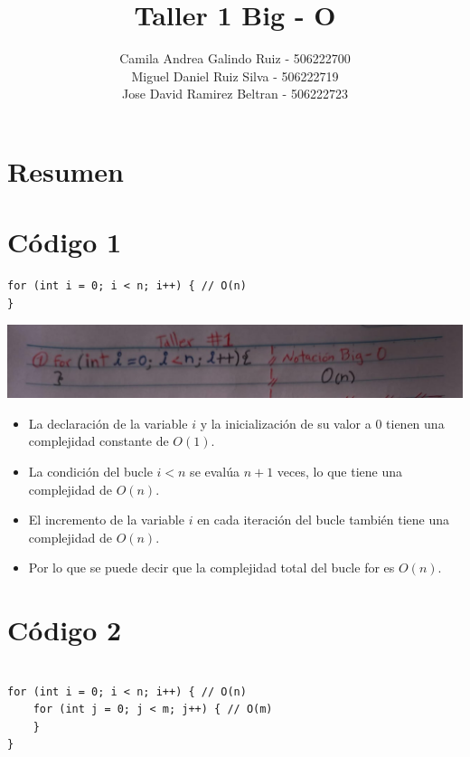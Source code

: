 \documentclass[a4paper,onecolumn,10pt]{article}
\title{Taller 1 Big - O }
\author{Camila Andrea Galindo Ruiz - 506222700\\Miguel Daniel Ruiz Silva - 506222719\\Jose David Ramirez Beltran - 506222723}
\begin{document}
\maketitle

\section{Resumen}

\section{Código 1}

\begin{verbatim}
for (int i = 0; i < n; i++) { // O(n)
}
\end{verbatim}

\includegraphics[width=1.15\linewidth]{imagenes/punto 1.jpeg}

\begin{itemize}
    \item La declaración de la variable $i$ y la inicialización de su valor a $0$ tienen una complejidad constante de $O(1)$.
    
    \item La condición del bucle $i < n$ se evalúa $n + 1$ veces, lo que tiene una complejidad de $O(n)$.
    
    \item El incremento de la variable $i$ en cada iteración del bucle también tiene una complejidad de $O(n)$.
    
    \item Por lo que se puede decir que la complejidad total del bucle for es $O(n)$.
    
    \end{itemize}

\section{Código 2}

\begin{verbatim}

for (int i = 0; i < n; i++) { // O(n)
    for (int j = 0; j < m; j++) { // O(m)
    }
}

\end{verbatim}
\end{document}
